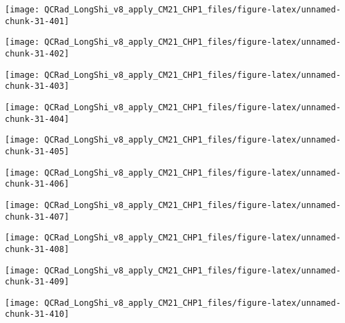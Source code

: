 \documentclass[
  10pt,
  a4paper,oneside]{article}
\begin{document}
\begin{center}\texttt{[image: QCRad\_LongShi\_v8\_apply\_CM21\_CHP1\_files/figure-latex/unnamed-chunk-31-401]} \end{center}

\begin{center}\texttt{[image: QCRad\_LongShi\_v8\_apply\_CM21\_CHP1\_files/figure-latex/unnamed-chunk-31-402]} \end{center}

\begin{center}\texttt{[image: QCRad\_LongShi\_v8\_apply\_CM21\_CHP1\_files/figure-latex/unnamed-chunk-31-403]} \end{center}

\begin{center}\texttt{[image: QCRad\_LongShi\_v8\_apply\_CM21\_CHP1\_files/figure-latex/unnamed-chunk-31-404]} \end{center}

\begin{center}\texttt{[image: QCRad\_LongShi\_v8\_apply\_CM21\_CHP1\_files/figure-latex/unnamed-chunk-31-405]} \end{center}

\begin{center}\texttt{[image: QCRad\_LongShi\_v8\_apply\_CM21\_CHP1\_files/figure-latex/unnamed-chunk-31-406]} \end{center}

\begin{center}\texttt{[image: QCRad\_LongShi\_v8\_apply\_CM21\_CHP1\_files/figure-latex/unnamed-chunk-31-407]} \end{center}

\begin{center}\texttt{[image: QCRad\_LongShi\_v8\_apply\_CM21\_CHP1\_files/figure-latex/unnamed-chunk-31-408]} \end{center}

\begin{center}\texttt{[image: QCRad\_LongShi\_v8\_apply\_CM21\_CHP1\_files/figure-latex/unnamed-chunk-31-409]} \end{center}

\begin{center}\texttt{[image: QCRad\_LongShi\_v8\_apply\_CM21\_CHP1\_files/figure-latex/unnamed-chunk-31-410]} \end{center}
\end{document}
